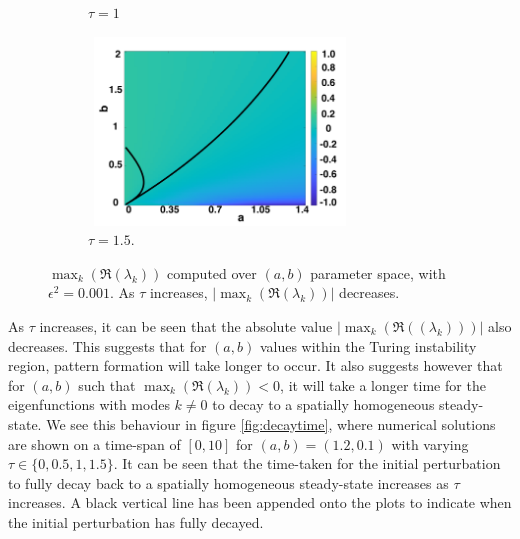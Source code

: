 \begin{figure}[H]
\begin{subfigure}[b]{0.45\textwidth}
        \caption{$\tau=1$}
        \label{}
    \end{subfigure}
    \hfill
    \begin{subfigure}[b]{0.45\textwidth}
        \centering
        \includegraphics[width=7cm,height=5cm]{tau15bif.png}
        \caption{$\tau=1.5$.}
        \label{}
    \end{subfigure}
    \caption{$\max_k(\Re(\lambda_k))$ computed over $(a,b)$ parameter space, with $\epsilon^2=0.001$. As $\tau$ increases, $|\max_k(\Re(\lambda_k))|$ decreases.}
    \label{fig:lambdavary}
\end{figure}
As $\tau$ increases, it can be seen that the absolute value $|\max_k(\Re((\lambda_k)))|$ also decreases. This suggests that for $(a,b)$ values within the Turing instability region, pattern formation will take longer to occur. It also suggests however that for $(a,b)$ such that $\max_k(\Re(\lambda_k))<0$, it will take a longer time for the eigenfunctions with modes $k\neq0$ to decay to a spatially homogeneous steady-state. We see this behaviour in figure \ref{fig:decaytime}, where numerical solutions are shown on a time-span of $[0,10]$ for $(a,b)=(1.2,0.1)$ with varying $\tau\in\{0,0.5,1,1.5\}$. It can be seen that the time-taken for the initial perturbation to fully decay back to a spatially homogeneous steady-state increases as $\tau$ increases. A black vertical line has been appended onto the plots to indicate when the initial perturbation has fully decayed.
